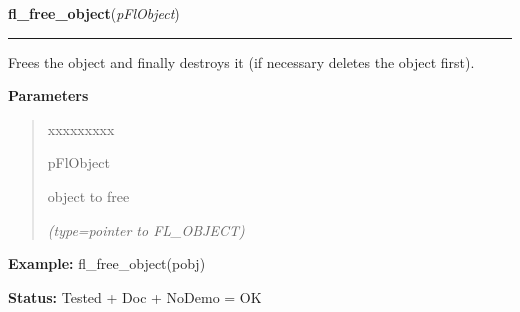 \hspace{.8\funcindent}\begin{boxedminipage}{\funcwidth}

    \raggedright \textbf{fl\_free\_object}(\textit{pFlObject})

    \vspace{-1.5ex}

    \rule{\textwidth}{0.5\fboxrule}
\setlength{\parskip}{2ex}
    Frees the object and finally destroys it (if necessary deletes the 
    object first).

\setlength{\parskip}{1ex}
      \textbf{Parameters}
      \vspace{-1ex}

      \begin{quote}
        \begin{Ventry}{xxxxxxxxx}

          \item[pFlObject]

          object to free

            {\it (type=pointer to FL\_OBJECT)}

        \end{Ventry}

      \end{quote}

\textbf{Example:} fl\_free\_object(pobj)



\textbf{Status:} Tested + Doc + NoDemo = OK



    \end{boxedminipage}

    \label{xformslib:flbasic:fl_delete_object}

    \vspace{0.5ex}

